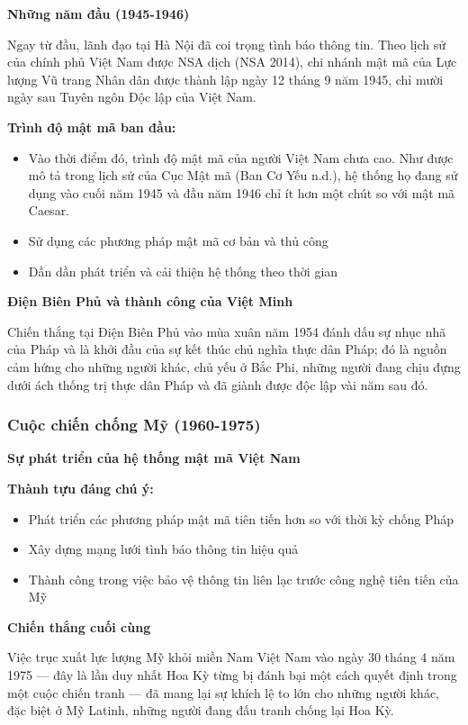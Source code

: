 \textbf{Những năm đầu (1945-1946)}

Ngay từ đầu, lãnh đạo tại Hà Nội đã coi trọng tình báo thông tin. Theo lịch sử của chính phủ Việt Nam được NSA dịch (NSA 2014), chi nhánh mật mã của Lực lượng Vũ trang Nhân dân được thành lập ngày 12 tháng 9 năm 1945, chỉ mười ngày sau Tuyên ngôn Độc lập của Việt Nam.

\textbf{Trình độ mật mã ban đầu:}
\begin{itemize}
\item Vào thời điểm đó, trình độ mật mã của người Việt Nam chưa cao. Như được mô tả trong lịch sử của Cục Mật mã (Ban Cơ Yếu n.d.), hệ thống họ đang sử dụng vào cuối năm 1945 và đầu năm 1946 chỉ ít hơn một chút so với mật mã Caesar.
\item Sử dụng các phương pháp mật mã cơ bản và thủ công
\item Dần dần phát triển và cải thiện hệ thống theo thời gian
\end{itemize}

\textbf{Điện Biên Phủ và thành công của Việt Minh}

Chiến thắng tại Điện Biên Phủ vào mùa xuân năm 1954 đánh dấu sự nhục nhã của Pháp và là khởi đầu của sự kết thúc chủ nghĩa thực dân Pháp; đó là nguồn cảm hứng cho những người khác, chủ yếu ở Bắc Phi, những người đang chịu đựng dưới ách thống trị thực dân Pháp và đã giành được độc lập vài năm sau đó.

\subsubsection{Cuộc chiến chống Mỹ (1960-1975)}

\textbf{Sự phát triển của hệ thống mật mã Việt Nam}

\textbf{Thành tựu đáng chú ý:}
\begin{itemize}
\item Phát triển các phương pháp mật mã tiên tiến hơn so với thời kỳ chống Pháp
\item Xây dựng mạng lưới tình báo thông tin hiệu quả
\item Thành công trong việc bảo vệ thông tin liên lạc trước công nghệ tiên tiến của Mỹ
\end{itemize}

\textbf{Chiến thắng cuối cùng}

Việc trục xuất lực lượng Mỹ khỏi miền Nam Việt Nam vào ngày 30 tháng 4 năm 1975 — đây là lần duy nhất Hoa Kỳ từng bị đánh bại một cách quyết định trong một cuộc chiến tranh — đã mang lại sự khích lệ to lớn cho những người khác, đặc biệt ở Mỹ Latinh, những người đang đấu tranh chống lại Hoa Kỳ.

